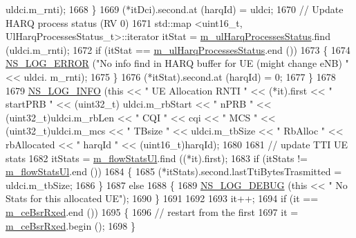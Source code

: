 \begin{DoxyCode}
      uldci.m\_rnti);
1668             \}
1669           (*itDci).second.at (harqId) = uldci;
1670           \textcolor{comment}{// Update HARQ process status (RV 0)}
1671           std::map <uint16\_t, UlHarqProcessesStatus\_t>::iterator itStat = 
      \hyperlink{classns3_1_1TdBetFfMacScheduler_a41bae8c97c560b2a314650d7e99bd356}{m\_ulHarqProcessesStatus}.find (uldci.m\_rnti);
1672           \textcolor{keywordflow}{if} (itStat == \hyperlink{classns3_1_1TdBetFfMacScheduler_a41bae8c97c560b2a314650d7e99bd356}{m\_ulHarqProcessesStatus}.end ())
1673             \{
1674               \hyperlink{group__logging_ga0261a8db1d4ac5f79417d117634fd455}{NS\_LOG\_ERROR} (\textcolor{stringliteral}{"No info find in HARQ buffer for UE (might change eNB) "} << uldci.
      m\_rnti);
1675             \}
1676           (*itStat).second.at (harqId) = 0;
1677         \}
1678 
1679       \hyperlink{group__logging_gafbd73ee2cf9f26b319f49086d8e860fb}{NS\_LOG\_INFO} (\textcolor{keyword}{this} << \textcolor{stringliteral}{" UE Allocation RNTI "} << (*it).first << \textcolor{stringliteral}{" startPRB "} << (uint32\_t)
      uldci.m\_rbStart << \textcolor{stringliteral}{" nPRB "} << (uint32\_t)uldci.m\_rbLen << \textcolor{stringliteral}{" CQI "} << cqi << \textcolor{stringliteral}{" MCS "} << (uint32\_t)uldci.m\_mcs 
      << \textcolor{stringliteral}{" TBsize "} << uldci.m\_tbSize << \textcolor{stringliteral}{" RbAlloc "} << rbAllocated << \textcolor{stringliteral}{" harqId "} << (uint16\_t)harqId);
1680 
1681       \textcolor{comment}{// update TTI  UE stats}
1682       itStats = \hyperlink{classns3_1_1TdBetFfMacScheduler_a192dacbea27307776249e60660fa005e}{m\_flowStatsUl}.find ((*it).first);
1683       \textcolor{keywordflow}{if} (itStats != \hyperlink{classns3_1_1TdBetFfMacScheduler_a192dacbea27307776249e60660fa005e}{m\_flowStatsUl}.end ())
1684         \{
1685           (*itStats).second.lastTtiBytesTrasmitted =  uldci.m\_tbSize;
1686         \}
1687       \textcolor{keywordflow}{else}
1688         \{
1689           \hyperlink{group__logging_ga413f1886406d49f59a6a0a89b77b4d0a}{NS\_LOG\_DEBUG} (\textcolor{keyword}{this} << \textcolor{stringliteral}{" No Stats for this allocated UE"});
1690         \}
1691 
1692 
1693       it++;
1694       \textcolor{keywordflow}{if} (it == \hyperlink{classns3_1_1TdBetFfMacScheduler_ab10364d54dad2ec2afed0c168cdad4d3}{m\_ceBsrRxed}.end ())
1695         \{
1696           \textcolor{comment}{// restart from the first}
1697           it = \hyperlink{classns3_1_1TdBetFfMacScheduler_ab10364d54dad2ec2afed0c168cdad4d3}{m\_ceBsrRxed}.begin ();
1698         \}

\end{DoxyCode}
